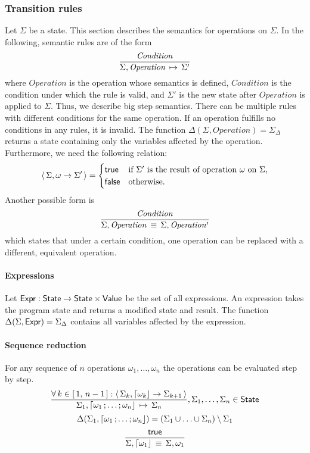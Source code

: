 \subsubsection{Transition rules}
Let $\Sigma$ be a state.
This section describes the semantics for operations on $\Sigma$.
In the following, semantic rules are of the form
	$$\frac{\mathit{Condition}}{{\Sigma, \mathit{Operation}} \,\mapsto\, \Sigma'}$$
	where
		$\mathit{Operation}$ is the operation whose semantics is defined,
		$\mathit{Condition}$ is the condition under which the rule is valid, and
		$\Sigma'$ is the new state after $\mathit{Operation}$ is applied to $\Sigma$.
Thus, we describe big step semantics.
There can be multiple rules with different conditions for the same operation.
If an operation fulfills no conditions in any rules, it is invalid.
The function $\Delta(\Sigma, \mathit{Operation}) = \Sigma_\Delta$ returns a state containing only the variables affected by the operation.
Furthermore, we need the following relation:
$$\left\langle\, \Sigma, \omega \to \Sigma' \,\right\rangle = \begin{cases}
	\mathsf{true} & \text{if $\Sigma'$ is the result of operation $\omega$ on $\Sigma$,} \\
	\mathsf{false} & \text{otherwise.}
\end{cases}
$$
Another possible form is
$$
\frac{\mathit{Condition}}{\Sigma, \mathit{Operation} \,\equiv\, \Sigma, \mathit{Operation'}}
$$
which states that under a certain condition, one operation can be replaced with a different, equivalent operation.

\paragraph{Expressions}
Let $\mathsf{Expr}: \mathsf{State} \to \mathsf{State} \times \mathsf{Value}$ be the set of all expressions.
An expression takes the program state and returns a modified state and result.
The function $\Delta(\Sigma, \mathsf{Expr}) = \Sigma_{\Delta}$ contains all variables affected by the expression.

\paragraph{Sequence reduction}
For any sequence of $n$ operations $\omega_1, \ldots, \omega_n$ the operations can be evaluated step by step.
$$
\semrule{
	\forall\, k \in \range{1}{n-1}: \results{\Sigma_k}{\stmt{\omega_k}}{\Sigma_{k+1}}}
	{\Sigma_1, \stmt{\omega_1}{\ldots}{\omega_n}}
	{\Sigma_n},
	\Sigma_1, \ldots, \Sigma_n \in \State
$$
$$
	\Delta(\Sigma_1, \stmt{\omega_1}{\ldots}{\omega_n}) =
		(\Sigma_1 \cup \ldots \cup \Sigma_n) \setminus \Sigma_1
$$
$$
\semruleeq{\true}
	{\Sigma, \stmt{\omega_1}}
	{\Sigma, \omega_1}
$$

